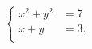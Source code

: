 \documentclass{article}
\begin{document}
\vspace*{\fill} \vspace*{-5ex}
$$
\left\{
\begin{aligned}
x^2+y^2&=7\\
x+y & = 3.\\
\end{aligned}
\right.
$$
\vspace*{\fill}
\end{document}
